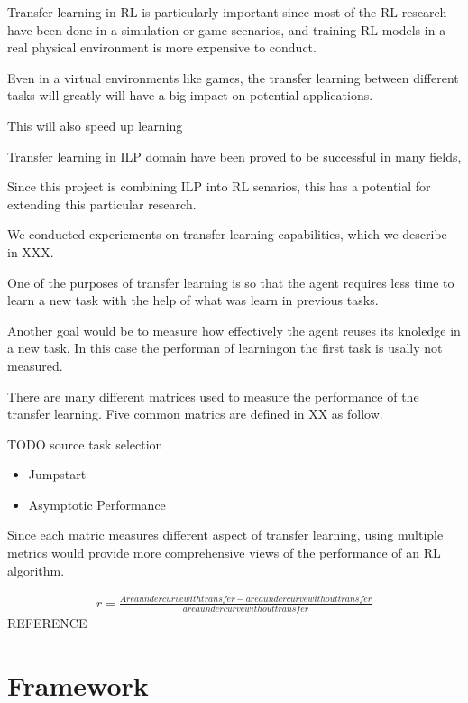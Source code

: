 \documentclass[12pt,twoside]{report}
\theoremstyle{plain}
\theoremstyle{definition}
\begin{document}
Transfer learning in RL is particularly important since most of the RL research have been done in a simulation or game scenarios, and training RL models in a real physical environment is more expensive to conduct. 

Even in a virtual environments like games,  the transfer learning between different tasks will greatly will have a big impact on potential applications. 

This will also speed up learning 

Transfer learning in ILP domain have been proved to be successful in many fields, 

Since this project is combining ILP into RL senarios, this has a potential for extending this particular research. 

We conducted experiements on transfer learning capabilities, which we describe in XXX. 

One of the  purposes of transfer learning is so that the agent requires less time to learn a new task with the help of what was learn in previous tasks.  


Another goal would be to measure how effectively the agent reuses its knoledge in a new task. 
In this case the performan of learningon the first task is usally not measured. 

There are many different matrices used to measure the performance of the transfer learning.
Five common matrics are defined in XX as follow.


TODO source task selection



\begin{itemize}
\item Jumpstart
\item Asymptotic Performance
\end{itemize}

Since each matric measures different aspect of transfer learning, using multiple metrics would provide more comprehensive views of the performance of an RL algorithm.

\begin{equation}
\begin{split}
r = \frac{Area under curve with transfer - area under curve without transfer}{area under curve without transfer}
\end{split}
\end{equation}
REFERENCE


\chapter{Framework}
\label{framework}

\end{document}
